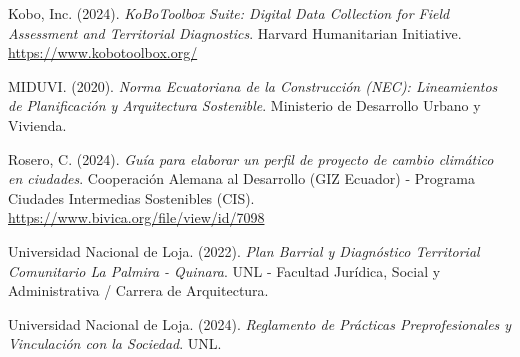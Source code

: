 \documentclass[
  spanish,
  letterpaper,
  DIV=11,
  numbers=noendperiod]{scrartcl}
\newlength{\cslhangindent}
\newenvironment{CSLReferences}[2] %
 {\begin{list}{}{%
  \setlength{\itemindent}{0pt}
  \setlength{\leftmargin}{0pt}
  \setlength{\parsep}{0pt}
  \ifodd #1
   \setlength{\leftmargin}{\cslhangindent}
   \setlength{\itemindent}{-1\cslhangindent}
  \fi
  \setlength{\itemsep}{#2\baselineskip}}}
 {\end{list}}
\begin{document}
\begin{CSLReferences}{1}{0}
Kobo, Inc. (2024). \emph{KoBoToolbox Suite: Digital Data Collection for
Field Assessment and Territorial Diagnostics}. Harvard Humanitarian
Initiative. \url{https://www.kobotoolbox.org/}

MIDUVI. (2020). \emph{Norma Ecuatoriana de la Construcción (NEC):
Lineamientos de Planificación y Arquitectura Sostenible}. Ministerio de
Desarrollo Urbano y Vivienda.

Rosero, C. (2024). \emph{Guía para elaborar un perfil de proyecto de
cambio climático en ciudades}. Cooperación Alemana al Desarrollo (GIZ
Ecuador) - Programa Ciudades Intermedias Sostenibles (CIS).
\url{https://www.bivica.org/file/view/id/7098}

Universidad Nacional de Loja. (2022). \emph{Plan Barrial y Diagnóstico
Territorial Comunitario La Palmira - Quinara}. UNL - Facultad Jurídica,
Social y Administrativa / Carrera de Arquitectura.

Universidad Nacional de Loja. (2024). \emph{Reglamento de Prácticas
Preprofesionales y Vinculación con la Sociedad}. UNL.

\end{CSLReferences}
\end{document}
